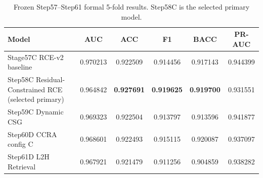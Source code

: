 \begin{table}[t]
\centering
\caption{Frozen Step57--Step61 formal 5-fold results. Step58C is the selected primary model.}
\label{tab:stage63-main-results}
\begin{tabular}{lccccc}
\hline
Model & AUC & ACC & F1 & BACC & PR-AUC \\
\hline
Stage57C RCE-v2 baseline & 0.970213 & 0.922509 & 0.914456 & 0.917143 & 0.944399 \\
Step58C Residual-Constrained RCE (selected primary) & 0.964842 & \textbf{0.927691} & \textbf{0.919625} & \textbf{0.919700} & 0.931551 \\
Step59C Dynamic CSG & 0.969323 & 0.922504 & 0.913797 & 0.913596 & 0.941877 \\
Step60D CCRA config C & 0.968601 & 0.922493 & 0.915115 & 0.920087 & 0.937097 \\
Step61D L2H Retrieval & 0.967921 & 0.921479 & 0.911256 & 0.904859 & 0.938282 \\
\hline
\end{tabular}
\end{table}

